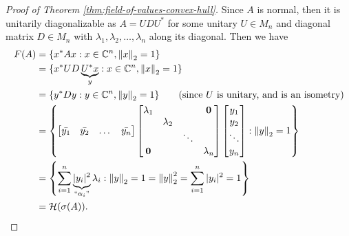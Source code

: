 \begin{proof}[Proof of Theorem \ref{thm:field-of-values-convex-hull}]
Since $A$ is normal, then it is unitarily diagonalizable as $A = UDU^*$ for some unitary $U \in M_n$ and diagonal matrix $D \in M_n$ with $\lambda_1, \lambda_2, \dots, \lambda_n$ along its diagonal. Then we have
\begin{align*}
    F(A) 
        &= \{x^*Ax : x \in \mathbb C^n, \left\lVert x\right\rVert_2 = 1\} \\
        &= \{x^*UD\underbrace{U^*x}_{y} : x \in \mathbb C^n, \left\lVert x\right\rVert_2 = 1\} \\
        &= \{y^*Dy : y \in \mathbb C^n, \left\lVert y\right\rVert_2 = 1\} \quad \quad \text{(since } U \text{ is unitary, and is an isometry)} \\
        &= \left\{
            \begin{bmatrix} \Bar{y_1} & \Bar{y_2} & \dots & \Bar{y_n}  \end{bmatrix} 
            \begin{bmatrix}
                \lambda_1 & & & \mathbf{0} \\
                & \lambda_2 & & \\
                & & \ddots & \\
                \mathbf{0} & & & \lambda_n
            \end{bmatrix}
            \begin{bmatrix}
            y_1 \\ y_2 \\ \ddots \\ y_n
            \end{bmatrix}: \left\lVert y\right\rVert_2 = 1\right\} \\
        &= \left\{\sum_{i=1}^n \underbrace{|y_i|^2}_{``\alpha_i"} \lambda_i : \left\lVert y\right\rVert_2 = 1 = \left\lVert y\right\rVert_2^2 = \sum_{i=1}^n |y_i|^2 = 1 \right\} \\
        &= \mathcal{H}(\sigma(A)).
\end{align*}


\end{proof}
